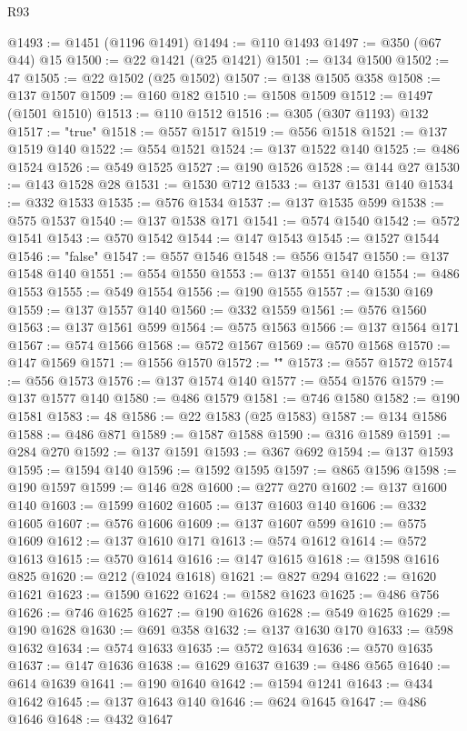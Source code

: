\begin{lexlean}{R93}
\begin{coremodule}
@1493 := @1451 (@1196 @1491)
@1494 := @110 @1493
@1497 := @350 (@67 @44) @15
@1500 := @22 @1421 (@25 @1421)
@1501 := @134 @1500
@1502 := 47
@1505 := @22 @1502 (@25 @1502)
@1507 := @138 @1505 @358
@1508 := @137 @1507
@1509 := @160 @182
@1510 := @1508 @1509
@1512 := @1497 (@1501 @1510)
@1513 := @110 @1512
@1516 := @305 (@307 @1193) @132
@1517 := "true"
@1518 := @557 @1517
@1519 := @556 @1518
@1521 := @137 @1519 @140
@1522 := @554 @1521
@1524 := @137 @1522 @140
@1525 := @486 @1524
@1526 := @549 @1525
@1527 := @190 @1526
@1528 := @144 @27
@1530 := @143 @1528 @28
@1531 := @1530 @712
@1533 := @137 @1531 @140
@1534 := @332 @1533
@1535 := @576 @1534
@1537 := @137 @1535 @599
@1538 := @575 @1537
@1540 := @137 @1538 @171
@1541 := @574 @1540
@1542 := @572 @1541
@1543 := @570 @1542
@1544 := @147 @1543
@1545 := @1527 @1544
@1546 := "false"
@1547 := @557 @1546
@1548 := @556 @1547
@1550 := @137 @1548 @140
@1551 := @554 @1550
@1553 := @137 @1551 @140
@1554 := @486 @1553
@1555 := @549 @1554
@1556 := @190 @1555
@1557 := @1530 @169
@1559 := @137 @1557 @140
@1560 := @332 @1559
@1561 := @576 @1560
@1563 := @137 @1561 @599
@1564 := @575 @1563
@1566 := @137 @1564 @171
@1567 := @574 @1566
@1568 := @572 @1567
@1569 := @570 @1568
@1570 := @147 @1569
@1571 := @1556 @1570
@1572 := "\""
@1573 := @557 @1572
@1574 := @556 @1573
@1576 := @137 @1574 @140
@1577 := @554 @1576
@1579 := @137 @1577 @140
@1580 := @486 @1579
@1581 := @746 @1580
@1582 := @190 @1581
@1583 := 48
@1586 := @22 @1583 (@25 @1583)
@1587 := @134 @1586
@1588 := @486 @871
@1589 := @1587 @1588
@1590 := @316 @1589
@1591 := @284 @270
@1592 := @137 @1591
@1593 := @367 @692
@1594 := @137 @1593
@1595 := @1594 @140
@1596 := @1592 @1595
@1597 := @865 @1596
@1598 := @190 @1597
@1599 := @146 @28
@1600 := @277 @270
@1602 := @137 @1600 @140
@1603 := @1599 @1602
@1605 := @137 @1603 @140
@1606 := @332 @1605
@1607 := @576 @1606
@1609 := @137 @1607 @599
@1610 := @575 @1609
@1612 := @137 @1610 @171
@1613 := @574 @1612
@1614 := @572 @1613
@1615 := @570 @1614
@1616 := @147 @1615
@1618 := @1598 @1616 @825
@1620 := @212 (@1024 @1618)
@1621 := @827 @294
@1622 := @1620 @1621
@1623 := @1590 @1622
@1624 := @1582 @1623
@1625 := @486 @756
@1626 := @746 @1625
@1627 := @190 @1626
@1628 := @549 @1625
@1629 := @190 @1628
@1630 := @691 @358
@1632 := @137 @1630 @170
@1633 := @598 @1632
@1634 := @574 @1633
@1635 := @572 @1634
@1636 := @570 @1635
@1637 := @147 @1636
@1638 := @1629 @1637
@1639 := @486 @565
@1640 := @614 @1639
@1641 := @190 @1640
@1642 := @1594 @1241
@1643 := @434 @1642
@1645 := @137 @1643 @140
@1646 := @624 @1645
@1647 := @486 @1646
@1648 := @432 @1647

\end{coremodule}
\end{lexlean}
